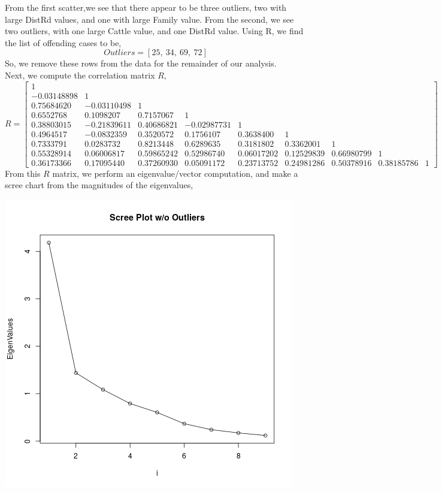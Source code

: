 \documentclass[letterpaper,10pt]{article}
\begin{document}
\begin{enumerate}
\begin{center}
\end{center}
From the first scatter,we see that there appear to be three outliers, two with large DistRd values, and one with large Family value. From the second, we see two outliers, with one large Cattle value, and one DistRd value. Using R, we find the list of offending cases to be,
\[Outliers = [25,\ 34,\ 69,\ 72]\]
So, we remove these rows from the data for the remainder of our analysis.\\
Next, we compute the correlation matrix $R$,
\[R=\begin{bmatrix}
1\\
-0.03148898 & 1\\
0.75684620 & -0.03110498 & 1\\
0.6552768 & 0.1098207 & 0.7157067 & 1\\
0.38803015 & -0.21839611 & 0.40686821 & -0.02987731 & 1\\
0.4964517 & -0.0832359 & 0.3520572 & 0.1756107 & 0.3638400 & 1\\
0.7333791  & 0.0283732 & 0.8213448 & 0.6289635 & 0.3181802 & 0.3362001 & 1\\
0.55328914 & 0.06006817 & 0.59865242 & 0.52986740 & 0.06017202 & 0.12529839 & 0.66980799 & 1\\
0.36173366 & 0.17095440 & 0.37260930 & 0.05091172 & 0.23713752 & 0.24981286 & 0.50378916 & 0.38185786 & 1
\end{bmatrix} \]
From this $R$ matrix, we perform an eigenvalue/vector computation, and make a scree chart from the magnitudes of the eigenvalues,
\begin{center}
\includegraphics[scale=.5]{farmscree.png}

\end{center}
\end{enumerate}
\end{document}
